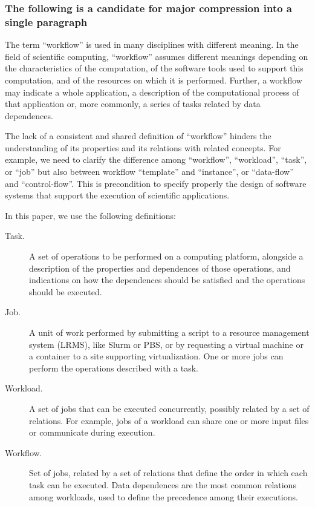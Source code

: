 \subsubsection*{The following is a candidate for major compression into a single paragraph}



The term ``workflow'' is used in many disciplines with different meaning. In the
field of scientific computing, ``workflow'' assumes different meanings depending
on the characteristics of the computation, of the software tools used to support
this computation, and of the resources on which it is performed. Further, a
workflow may indicate a whole application, a description of the computational
process of that application or, more commonly, a series of tasks related by data
dependences.

The lack of a consistent and shared definition of ``workflow'' hinders the
understanding of its properties and its relations with related concepts. For
example, we need to clarify the difference among ``workflow'', ``workload'',
``task'', or ``job'' but also between workflow ``template'' and ``instance'', or
``data-flow'' and ``control-flow''. This is precondition to specify properly the
design of software systems that support the execution of scientific
applications.

In this paper, we use the following definitions:

\begin{description}

  \item[Task.] A set of operations to be performed on a computing platform,
  alongside a description of the properties and dependences of those operations,
  and indications on how the dependences should be satisfied and the operations
  should be executed.

  \item[Job.] A unit of  work performed by submitting a script to a resource
  management system (LRMS), like  Slurm or PBS, or by requesting a virtual
  machine or a container to a site supporting virtualization. One or more jobs
  can perform the operations described with a task.

  \item[Workload.] A set of jobs that can be executed concurrently, possibly
  related by a set of relations. For example, jobs of a workload can share one
  or more input files or communicate during execution.

  \item[Workflow.] Set of jobs, related by a set of relations that define the
  order in which each task can be executed. Data dependences are the most common
  relations among workloads, used to define the precedence among their
  executions.

\end{description}
